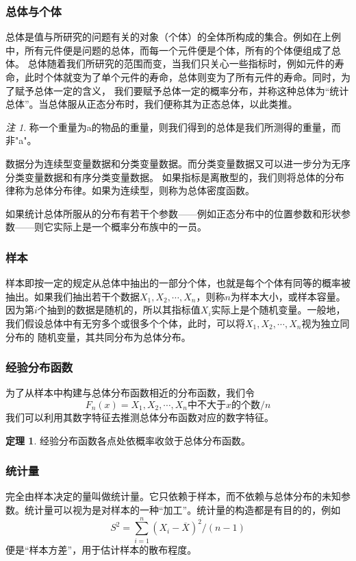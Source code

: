 \documentclass[a4paper,11pt]{article}%
\theoremstyle{remark}
\newtheorem*{remark}{注}
\theoremstyle{remark}
\theoremstyle{definition}
\newtheorem{theorem}{定理}[section]
\theoremstyle{definition}
\theoremstyle{plain}
\begin{document}
\subsubsection{总体与个体}
总体是值与所研究的问题有关的对象（个体）的全体所构成的集合。例如在上例中，所有元件便是问题的总体，而每一个元件便是个体，所有的个体便组成了总体。
总体随着我们所研究的范围而变，当我们只关心一些指标时，例如元件的寿命，此时个体就变为了单个元件的寿命，总体则变为了所有元件的寿命。同时，为了赋予总体一定的含义，
我们要赋予总体一定的概率分布，并称这种总体为“统计总体”。当总体服从正态分布时，我们便称其为正态总体，以此类推。
\begin{remark}
    称一个重量为a的物品的重量，则我们得到的总体是我们所测得的重量，而非"a"。
\end{remark}
数据分为连续型变量数据和分类变量数据。而分类变量数据又可以进一步分为无序分类变量数据和有序分类变量数据。
如果指标是离散型的，我们则将总体的分布律称为总体分布律。如果为连续型，则称为总体密度函数。

如果统计总体所服从的分布有若干个参数——例如正态分布中的位置参数和形状参数——则它实际上是一个概率分布族中的一员。
\subsubsection{样本}
样本即按一定的规定从总体中抽出的一部分个体，也就是每个个体有同等的概率被抽出。如果我们抽出若干个数据$X_1,X_2,\cdots,X_n$，则称$n$为样本大小，或样本容量。
因为第$i$个抽到的数据是随机的，所以其指标值$X_i$实际上是个随机变量。一般地，我们假设总体中有无穷多个或很多个个体，此时，可以将$X_1,X_2,\cdots,X_n$视为独立同分布的
随机变量，其共同分布为总体分布。
\subsubsection{经验分布函数}
为了从样本中构建与总体分布函数相近的分布函数，我们令
\[F_n(x)=X_1,X_2,\cdots,X_n \text{中不大于}x\text{的个数}/n\]
我们可以利用其数字特征去推测总体分布函数对应的数字特征。
\begin{theorem}
    经验分布函数各点处依概率收敛于总体分布函数。
\end{theorem}
\subsubsection{统计量}
完全由样本决定的量叫做统计量。它只依赖于样本，而不依赖与总体分布的未知参数。统计量可以视为是对样本的一种“加工”。统计量的构造都是有目的的，例如
\[S^2=\sum_{i=1}^n(X_i-\overline{X})^2/(n-1)\]
便是“样本方差”，用于估计样本的散布程度。
\end{document}
